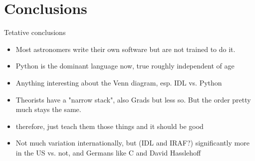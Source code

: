 \section{Conclusions}

Tetative conclusions
\begin{itemize}
\item Most astronomers write their own software but are not trained to do it.
\item Python is the dominant language now, true roughly independent of age
\item Anything interesting about the Venn diagram, esp. IDL vs. Python
\item Theorists have a "narrow stack", also Grads but less so.  But the order pretty much stays the same.
\item therefore, just teach them those things and it should be good
\item Not much variation internationally, but (IDL and IRAF?) significantly more in the US vs. not, and Germans like C and David Hasslehoff
\end{itemize}
